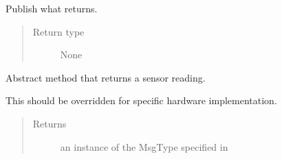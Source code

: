 \documentclass[a4paper,12pt,twoside]{article}
\begin{document}
\begin{fulllineitems}
\begin{quote}
\begin{description}
\begin{itemize}
\end{itemize}

\end{description}\end{quote}

\begin{fulllineitems}
\label{\detokenize{osbk_devices:osbk_devices.sensor_base.SensorBase.publish_reading}}
Publish what  returns.
\begin{quote}\begin{description}
\item[{Return type}] \leavevmode
None

\end{description}\end{quote}

\end{fulllineitems}


\begin{fulllineitems}
\label{\detokenize{osbk_devices:osbk_devices.sensor_base.SensorBase.read_sensor}}
Abstract method that returns a sensor reading.

This should be overridden for specific hardware implementation.
\begin{quote}\begin{description}
\item[{Returns}] \leavevmode
an instance of the MsgType specified in 

\end{description}\end{quote}

\end{fulllineitems}


\end{fulllineitems}
\clearpage
{}\label{\detokenize{osbk_devices:module-osbk_devices.actuator_base}}
\end{document}
